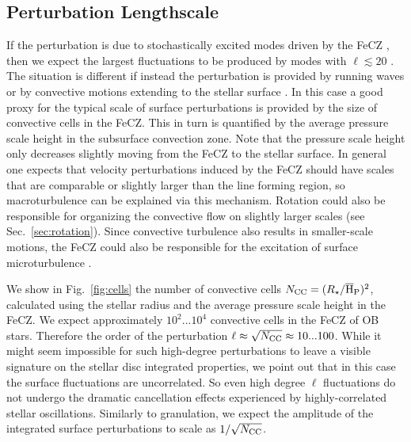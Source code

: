\documentclass[twocolumn]{aastex63}
\begin{document}
{\bf 
\subsection{Perturbation Lengthscale}
If the perturbation is due to stochastically excited modes driven by the FeCZ \citep{Grassitelli:2015}, then we expect the largest fluctuations to be produced by modes with $\ell \lesssim 20$ \citep[see e.g.][]{Godart:2017}. 
The situation is different if instead the perturbation is provided by running waves or by convective motions extending to the stellar surface  \citep{Cantiello:2009,2015ApJ...813...74J}.  
In this case a good proxy for the typical scale of surface perturbations is provided by the size of convective cells in the FeCZ. 
This in turn is quantified by the average pressure scale height in the subsurface convection zone. Note that the pressure scale height only decreases slightly moving from the FeCZ to the stellar surface. 
In general one expects that velocity perturbations induced by the FeCZ should have scales that are  comparable or slightly larger than the line forming region, so  macroturbulence can be explained via this mechanism.
Rotation could also be responsible for organizing the convective flow on slightly larger scales (see Sec.~\ref{sec:rotation}).
Since  convective turbulence  also results in smaller-scale motions, the FeCZ could also be responsible for the excitation of surface microturbulence \citep{Cantiello:2009}. 

We show in Fig.~\ref{fig:cells} the number of convective cells $N_{\rm CC} = (R_\star/\overline{\rm H}_{\rm P})^2$,  calculated using the stellar radius  and the average pressure scale height in the FeCZ. 
We expect approximately $10^2...10^4$ convective cells in the FeCZ of OB stars.  Therefore the order of the perturbation $\ell \approx \sqrt{N_{\rm CC}}\approx 10...100$. 
While it might seem impossible for such high-degree perturbations to leave a visible signature on the stellar disc integrated properties, we point out that in this case the surface fluctuations are uncorrelated. So even high degree $\ell$ fluctuations do not  undergo the dramatic cancellation effects experienced by highly-correlated stellar oscillations. Similarly to granulation, we expect the amplitude of the integrated surface perturbations to scale as  $1/\sqrt{N_{\rm CC}}$.
}   
\end{document}
